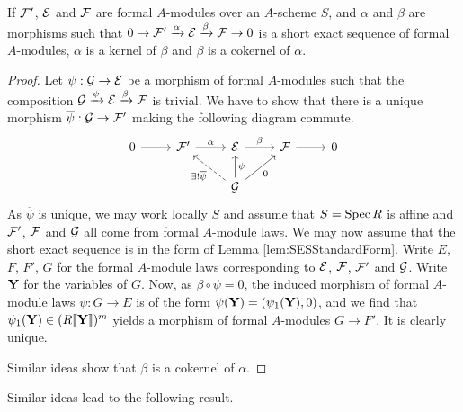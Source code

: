 \documentclass[../main.tex]{subfiles}
\begin{document}
\begin{lem}
  If $\mathcal{F}'$, $\mathcal{E}$ and $\mathcal{F}$ are formal $A$-modules over an $A$-scheme $S$,
  and $\alpha$ and $\beta$ are morphisms such that 
  $0 \to \mathcal{F}' \xrightarrow{\alpha} \mathcal{E} \xrightarrow{\beta} \mathcal{F} \to 0$ 
  is a short exact sequence of formal $A$-modules, $\alpha$ is a kernel of
  $\beta$ and $\beta$ is a cokernel of $\alpha$. 
\begin{proof}
  Let $\psi: \mathcal{G} \to \mathcal{E}$ be a morphism of formal $A$-modules such that
  the composition $\mathcal{G} \xrightarrow{\psi} \mathcal{E} \xrightarrow{\beta} \mathcal{F}$ is trivial. 
  We have to show that there is a unique morphism $\overline \psi: \mathcal{G} \to 
  \mathcal{F}'$ making the following diagram commute.
  \begin{equation*}
    \begin{tikzcd}[ampersand replacement=\&]
    	0 \& {\cF'} \& \cE \& \cF \& 0 \\
    	\&\& \cG
    	\arrow[from=1-1, to=1-2]
    	\arrow["\alpha", from=1-2, to=1-3]
    	\arrow["\beta", from=1-3, to=1-4]
    	\arrow[from=1-4, to=1-5]
    	\arrow["{\exists!\overline \psi}", dashed, from=2-3, to=1-2]
    	\arrow["{\psi}"', from=2-3, to=1-3]
    	\arrow["0"', from=2-3, to=1-4]
    \end{tikzcd}
  \end{equation*}
  As $\overline \psi$ is unique, we may work locally $S$ and assume that $S =
  \operatorname{Spec} R$ is affine and 
  $\mathcal{F}'$, $\mathcal{F}$ and $\mathcal{G}$ all come from formal $A$-module laws. We may
  now assume that the short exact sequence is in the form of Lemma
  \ref{lem:SESStandardForm}. Write $E$, $F$, $F'$, $G$ for the 
  formal $A$-module laws corresponding to $\mathcal{E}$, $\mathcal{F}$, $\mathcal{F}'$ and 
  $\mathcal{G}$. Write $\mathbf{Y}$ for the variables of $G$. Now, as 
  $\beta \circ \psi = 0$, the induced morphism of
  formal $A$-module laws $\psi: G \to E$ is of the form $\psi(\mathbf{Y}) =
  (\psi_1(\mathbf{Y}), 0)$, and we find that $\psi_1(\mathbf{Y}) \in (R\llbracket \mathbf{Y} \rrbracket)^m$
  yields a morphism of formal $A$-modules $G \to F'$. It is clearly unique. 
  
  Similar ideas show that $\beta$ is a cokernel of $\alpha$. 
\end{proof}

\end{lem}

Similar ideas lead to the following result.
\end{document}
